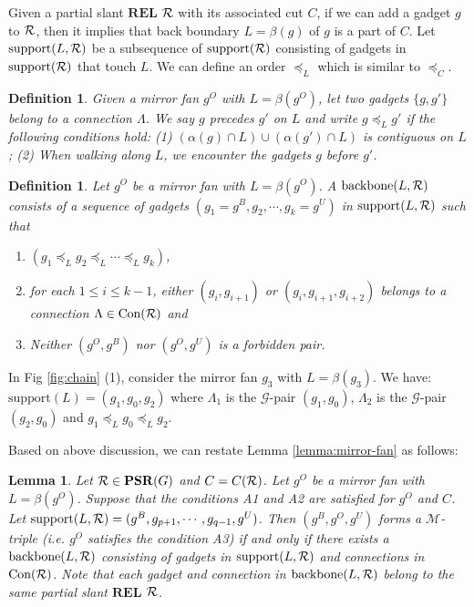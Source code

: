 \documentclass[11pt]{article}
\newcommand{\R}{{\cal R}}
\newcommand{\MM}{\mathcal{M}}
\newcommand{\GG}{\mathcal{G}}
\newcommand{\CON}{\mbox{Con}}
\newcommand{\REL}{\mathbf{REL}}
\newcommand{\PSR}{\mathbf{PSR}}
\newtheorem{definition}[figure]{Definition}
\newtheorem{lemma}[figure]{Lemma}
\begin{document}
Given a partial slant $\REL$ $\R$ with its associated cut $C$,
if we can add a gadget $g$ to $\R$,
then it implies that back boundary $L=\beta(g)$ of $g$ is a part of $C$.
Let $\mbox{support}(L, \R)$ be a subsequence of $\mbox{support}(\R)$
consisting of gadgets in $\mbox{support}(\R)$ that touch $L$.
We can define an order $\preceq_L$ which is similar to $\preceq_C$.


\begin{definition}\label{def:lessthan-L}
Given a mirror fan $g^O$ with $L=\beta(g^O)$,
let two gadgets $\{g, g'\}$ belong to a connection $\Lambda$.
We say $g$ { \em precedes} $g'$ on $L$ and write
$g\preceq_L g'$ if the following conditions hold:
(1) $(\alpha(g)\cap L) \cup  (\alpha(g')\cap L)$ is contiguous on $L$;
(2) When walking along $L$, we encounter the gadgets $g$
before $g'$.
\end{definition}


\begin{definition}\label{def:backbone}
Let $g^O$ be a mirror fan with $L=\beta(g^O)$. A $\mbox{backbone}(L, \R)$
consists of a sequence of gadgets $(g_1=g^B, g_2, \cdots, g_k=g^U)$
in $\mbox{support}(L,\R)$ such that
\begin{enumerate}
\item $(g_1\preceq_L g_2 \preceq_L \cdots \preceq_L g_k)$,

\item for each $1\leq i\leq k-1$,
either $(g_i, g_{i+1})$ or $(g_i, g_{i+1}, g_{i+2})$ belongs to
a connection $\Lambda \in \CON(\R)$ and

\item Neither $(g^O, g^B)$ nor $(g^O, g^U)$ is a forbidden pair.
\end{enumerate}
\end{definition}

In Fig \ref{fig:chain} (1), consider the mirror fan $g_3$ with $L=\beta(g_3)$.
We have: $\mbox{support}(L)=(g_1, g_0, g_2)$
 where $\Lambda_1$ is the
$\GG$-pair $(g_1, g_0)$,
$\Lambda_2$ is the $\GG$-pair $(g_2, g_0)$ and
$g_1 \preceq_L g_0 \preceq_L g_2$.


Based on above discussion, we can restate Lemma \ref{lemma:mirror-fan}
as follows:

\begin{lemma}\label{lemma:valid-mirror-fan}
Let $\R\in \PSR(G)$ and $C = C(\R)$. Let $g^O$ be a mirror fan with
$L=\beta(g^O)$. Suppose that the conditions A1 and A2 are satisfied for
$g^O$ and $C$. Let $\mbox{support}(L, \R)=(g^B, g_{p+1}, \cdots, g_{q-1}, g^U)$.
Then $(g^B,g^O,g^U)$ forms a $\MM$-triple (i.e. $g^O$ satisfies the
condition A3) if and only if there exists a $\mbox{backbone}(L,\R)$
consisting of gadgets in $\mbox{support}(L,\R)$ and connections in $\CON(\R)$.
Note that each gadget and connection in $\mbox{backbone}(L, \R)$
belong to the same partial slant $\REL$ $\R$.
\end{lemma}
\end{document}
